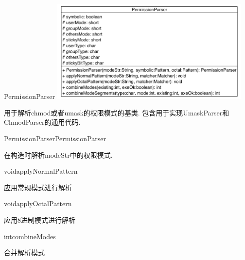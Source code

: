 \begin{XeClass}{PermissionParser}
\includegraphics[width=10cm]{cdig/PermissionParser.png}
     
 用于解析chmod或者umask的权限模式的基类.
 包含用于实现UmaskParser和ChmodParser的通用代码.

    \begin{XeMethod}{\XePublic}{PermissionParser}{PermissionParser}
         
 在构造时解析modeStr中的权限模式.

    \end{XeMethod}

    \begin{XeMethod}{\XePrivate}{void}{applyNormalPattern}
         
 应用常规模式进行解析

    \end{XeMethod}

    \begin{XeMethod}{\XePrivate}{void}{applyOctalPattern}
         
 应用8进制模式进行解析

    \end{XeMethod}

    \begin{XeMethod}{\XeProtected}{int}{combineModes}
         
 合并解析模式

    \end{XeMethod}

\end{XeClass}
